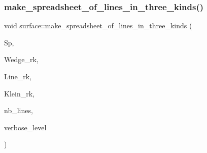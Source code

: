 \mbox{\label{classsurface_a2e3a3b2bdee605584b0538e0659e98a4}} 
\subsubsection{\texorpdfstring{make\+\_\+spreadsheet\+\_\+of\+\_\+lines\+\_\+in\+\_\+three\+\_\+kinds()}{make\_spreadsheet\_of\_lines\_in\_three\_kinds()}}
{\footnotesize\ttfamily void surface\+::make\+\_\+spreadsheet\+\_\+of\+\_\+lines\+\_\+in\+\_\+three\+\_\+kinds (\begin{DoxyParamCaption}\item[{\mbox{\hyperlink{classspreadsheet}{spreadsheet}} $\ast$\&}]{Sp,  }\item[{\mbox{\hyperlink{galois_8h_a09fddde158a3a20bd2dcadb609de11dc}{I\+NT}} $\ast$}]{Wedge\+\_\+rk,  }\item[{\mbox{\hyperlink{galois_8h_a09fddde158a3a20bd2dcadb609de11dc}{I\+NT}} $\ast$}]{Line\+\_\+rk,  }\item[{\mbox{\hyperlink{galois_8h_a09fddde158a3a20bd2dcadb609de11dc}{I\+NT}} $\ast$}]{Klein\+\_\+rk,  }\item[{\mbox{\hyperlink{galois_8h_a09fddde158a3a20bd2dcadb609de11dc}{I\+NT}}}]{nb\+\_\+lines,  }\item[{\mbox{\hyperlink{galois_8h_a09fddde158a3a20bd2dcadb609de11dc}{I\+NT}}}]{verbose\+\_\+level }\end{DoxyParamCaption})}

\mbox{\label{classsurface_af28732c1a6d01d57d18ac79632d63d69}} 
